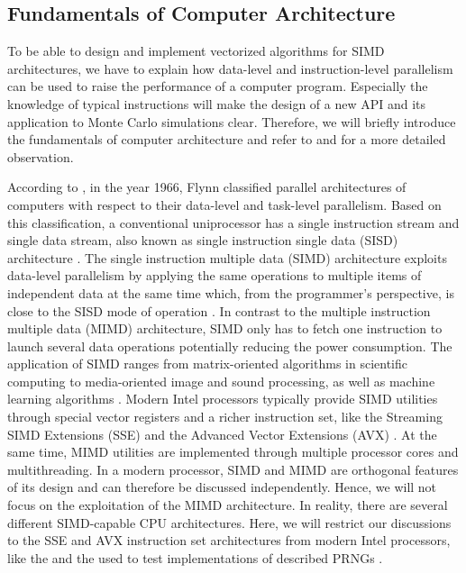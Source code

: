 \documentclass{stdlocal}
\begin{document}
\subsection{Fundamentals of Computer Architecture}
\label{sub:simd-capable_processors}
  To be able to design and implement vectorized algorithms for SIMD architectures, we have to explain how data-level and instruction-level parallelism can be used to raise the performance of a computer program.
  Especially the knowledge of typical instructions will make the design of a new API and its application to Monte Carlo simulations clear.
  Therefore, we will briefly introduce the fundamentals of computer architecture and refer to \textcite{patterson2014} and \textcite{hennessy2019} for a more detailed observation.

  According to \textcite[\ppno~10-11]{hennessy2019}, in the year 1966, Flynn classified parallel architectures of computers with respect to their data-level and task-level parallelism.
  Based on this classification, a conventional uniprocessor has a single instruction stream and single data stream, also known as single instruction single data (SISD) architecture \autocite[\ppno~509-510]{patterson2014}.
  The single instruction multiple data (SIMD) architecture exploits data-level parallelism by applying the same operations to multiple items of independent data at the same time \autocite{hennessy2019} which, from the programmer's perspective, is close to the SISD mode of operation \autocite{patterson2014}.
  In contrast to the multiple instruction multiple data (MIMD) architecture, SIMD only has to fetch one instruction to launch several data operations potentially reducing the power consumption.
  The application of SIMD ranges from matrix-oriented algorithms in scientific computing to media-oriented image and sound processing, as well as machine learning algorithms \autocite[\ppno~10-11]{hennessy2019}.
  Modern Intel processors typically provide SIMD utilities through special vector registers and a richer instruction set, like the Streaming SIMD Extensions (SSE) and the Advanced Vector Extensions (AVX) \autocite{intel-intrinsics-guide,fog2019a,fog2019b,fog2019c,fog2019d,fog2019e}.
  At the same time, MIMD utilities are implemented through multiple processor cores and multithreading.
  In a modern processor, SIMD and MIMD are orthogonal features of its design and can therefore be discussed independently.
  Hence, we will not focus on the exploitation of the MIMD architecture.
  In reality, there are several different SIMD-capable CPU architectures.
  Here, we will restrict our discussions to the SSE and AVX instruction set architectures from modern Intel processors, like the  and the  used to test implementations of described PRNGs \autocite{intel-kaby-lake-i5,intel-kaby-lake-i7}.
\end{document}
